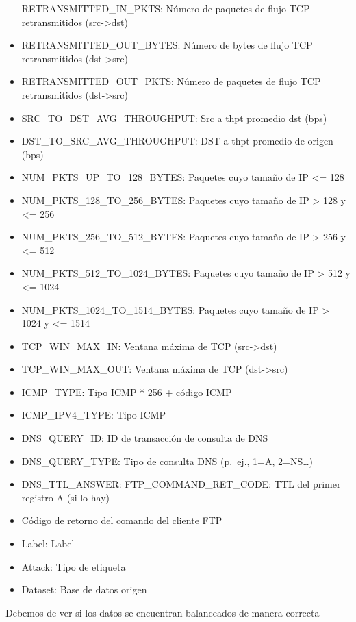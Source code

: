 \documentclass[
]{article}
\newenvironment{Shaded}{\begin{snugshade}}{\end{snugshade}}
\newcommand{\AttributeTok}[1]{\textcolor[rgb]{0.77,0.63,0.00}{#1}}
\newcommand{\FunctionTok}[1]{\textcolor[rgb]{0.00,0.00,0.00}{#1}}
\newcommand{\NormalTok}[1]{#1}
\newcommand{\SpecialCharTok}[1]{\textcolor[rgb]{0.00,0.00,0.00}{#1}}
\newcommand{\StringTok}[1]{\textcolor[rgb]{0.31,0.60,0.02}{#1}}
\begin{document}
\begin{itemize}
  RETRANSMITTED\_IN\_PKTS: Número de paquetes de flujo TCP
  retransmitidos (src-\textgreater dst)
\item
  RETRANSMITTED\_OUT\_BYTES: Número de bytes de flujo TCP retransmitidos
  (dst-\textgreater src)
\item
  RETRANSMITTED\_OUT\_PKTS: Número de paquetes de flujo TCP
  retransmitidos (dst-\textgreater src)
\item
  SRC\_TO\_DST\_AVG\_THROUGHPUT: Src a thpt promedio dst (bps)
\item
  DST\_TO\_SRC\_AVG\_THROUGHPUT: DST a thpt promedio de origen (bps)
\item
  NUM\_PKTS\_UP\_TO\_128\_BYTES: Paquetes cuyo tamaño de IP \textless=
  128
\item
  NUM\_PKTS\_128\_TO\_256\_BYTES: Paquetes cuyo tamaño de IP
  \textgreater{} 128 y \textless= 256
\item
  NUM\_PKTS\_256\_TO\_512\_BYTES: Paquetes cuyo tamaño de IP
  \textgreater{} 256 y \textless= 512
\item
  NUM\_PKTS\_512\_TO\_1024\_BYTES: Paquetes cuyo tamaño de IP
  \textgreater{} 512 y \textless= 1024
\item
  NUM\_PKTS\_1024\_TO\_1514\_BYTES: Paquetes cuyo tamaño de IP
  \textgreater{} 1024 y \textless= 1514
\item
  TCP\_WIN\_MAX\_IN: Ventana máxima de TCP (src-\textgreater dst)
\item
  TCP\_WIN\_MAX\_OUT: Ventana máxima de TCP (dst-\textgreater src)
\item
  ICMP\_TYPE: Tipo ICMP * 256 + código ICMP
\item
  ICMP\_IPV4\_TYPE: Tipo ICMP
\item
  DNS\_QUERY\_ID: ID de transacción de consulta de DNS
\item
  DNS\_QUERY\_TYPE: Tipo de consulta DNS (p.~ej., 1=A, 2=NS\ldots)
\item
  DNS\_TTL\_ANSWER: FTP\_COMMAND\_RET\_CODE: TTL del primer registro A
  (si lo hay)
\item
  Código de retorno del comando del cliente FTP
\item
  Label: Label
\item
  Attack: Tipo de etiqueta
\item
  Dataset: Base de datos origen
\end{itemize}

Debemos de ver si los datos se encuentran balanceados de manera correcta

\begin{Shaded}
\end{Shaded}
\end{document}
